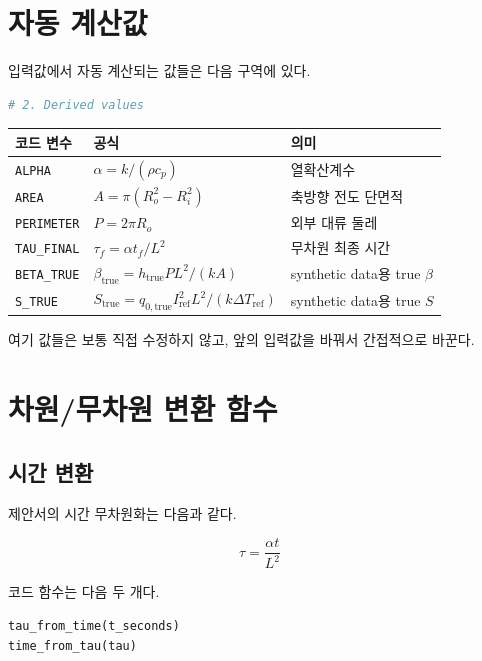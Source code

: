 \documentclass[11pt]{article}
\begin{document}
\section{자동 계산값}

입력값에서 자동 계산되는 값들은 다음 구역에 있다.

\begin{lstlisting}[language=Python]
# 2. Derived values
\end{lstlisting}

\begin{center}
\begin{tabular}{lll}
\toprule
코드 변수 & 공식 & 의미 \\
\midrule
\texttt{ALPHA} & \(\alpha = k/(\rho c_p)\) & 열확산계수 \\
\texttt{AREA} & \(A=\pi(R_o^2-R_i^2)\) & 축방향 전도 단면적 \\
\texttt{PERIMETER} & \(P=2\pi R_o\) & 외부 대류 둘레 \\
\texttt{TAU\_FINAL} & \(\tau_f=\alpha t_f/L^2\) & 무차원 최종 시간 \\
\texttt{BETA\_TRUE} & \(\beta_{\mathrm{true}}=h_{\mathrm{true}}PL^2/(kA)\) & synthetic data용 true \(\beta\) \\
\texttt{S\_TRUE} & \(S_{\mathrm{true}}=q_{0,\mathrm{true}}I_{\mathrm{ref}}^2L^2/(k\Delta T_{\mathrm{ref}})\) & synthetic data용 true \(S\) \\
\bottomrule
\end{tabular}
\end{center}

여기 값들은 보통 직접 수정하지 않고, 앞의 입력값을 바꿔서 간접적으로 바꾼다.

\section{차원/무차원 변환 함수}

\subsection{시간 변환}

제안서의 시간 무차원화는 다음과 같다.

\begin{equation}
\tau = \frac{\alpha t}{L^2}
\end{equation}

코드 함수는 다음 두 개다.

\begin{lstlisting}[language=Python]
tau_from_time(t_seconds)
time_from_tau(tau)
\end{lstlisting}
\end{document}
